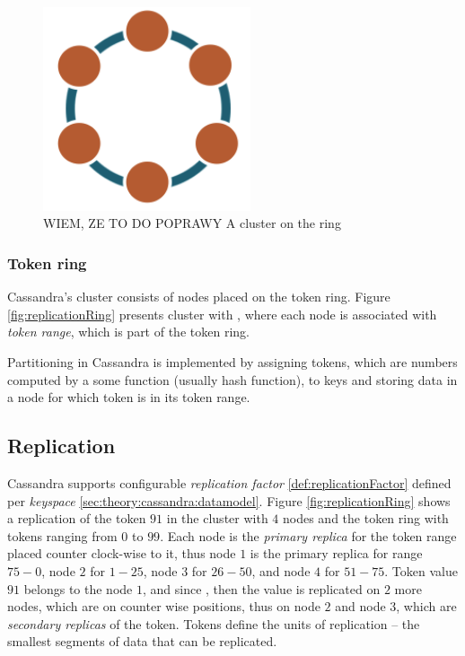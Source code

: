 \begin{figure}[H]
	\centering
	\includegraphics[height=60mm]{images/cassandra-ring.png}\hspace{10mm}
	\caption{WIEM, ZE TO DO POPRAWY A cluster on the ring}
	\label{fig:archCluster}
\end{figure}

\subsubsection{Token ring}
Cassandra's cluster consists of nodes placed on the token ring. Figure \ref{fig:replicationRing} presents cluster with , where each node is associated with \emph{token range}, which is part of the token ring. 

Partitioning in Cassandra is implemented by assigning tokens, which are numbers computed by a some function (usually hash function), to keys and storing data in a node for which token is in its token range. 

\subsection{Replication}
Cassandra supports configurable \emph{replication factor} \ref{def:replicationFactor} defined per \emph{keyspace} \ref{sec:theory:cassandra:datamodel}. Figure \ref{fig:replicationRing} shows a replication of the token $91$ in the cluster with $4$ nodes and the token ring with tokens ranging from $0$ to $99$. 
Each node is the \emph{primary replica} for the token range placed counter clock-wise to it, thus node $1$ is the primary replica for range $75-0$, node $2$ for $1-25$, node $3$ for $26-50$, and node $4$ for $51-75$. 
Token value $91$ belongs to the node $1$, and since , then the value is replicated on $2$ more nodes, which are on counter wise positions, thus on node $2$ and node $3$, which are \emph{secondary replicas} of the token. Tokens define the units of replication -- the smallest segments of data that can be replicated. 

